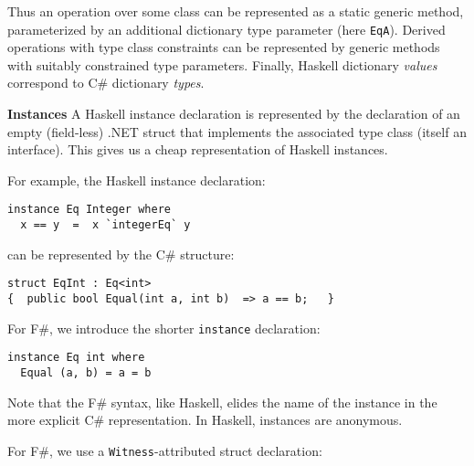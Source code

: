 \documentclass[9pt]{sig-alternate-05-2015}
\newif\ifclassic
\begin{document}
Thus an operation over some class can be represented as a static generic method, 
parameterized by an additional dictionary type parameter (here \lstinline{EqA}).
Derived operations with type class constraints can be represented by generic methods with suitably constrained type parameters.
Finally, Haskell dictionary \emph{values} correspond to  C\# dictionary \emph{types}.




{\bf Instances}
A Haskell instance declaration is represented by the declaration of an empty (field-less) .NET  struct that implements the associated type class (itself an interface).
This gives us a cheap representation of Haskell instances. 

For example, the Haskell instance declaration:


{\small
\begin{lstlisting}
instance Eq Integer where 
  x == y  =  x `integerEq` y
\end{lstlisting}
}
can be represented by the C\# structure:
\begin{lstlisting}
struct EqInt : Eq<int>  
{  public bool Equal(int a, int b)  => a == b;   }
\end{lstlisting}

\ifclassic
For F\#, we introduce the shorter \lstinline{instance} declaration:

\begin{lstlisting}
instance Eq int where 
  Equal (a, b) = a = b
\end{lstlisting}

Note that the F\# syntax, like Haskell, elides the name of the instance in the more explicit C\# representation.
In Haskell, instances are anonymous.

\else
For F\#, we use a \lstinline{Witness}-attributed struct declaration:
\end{document}
